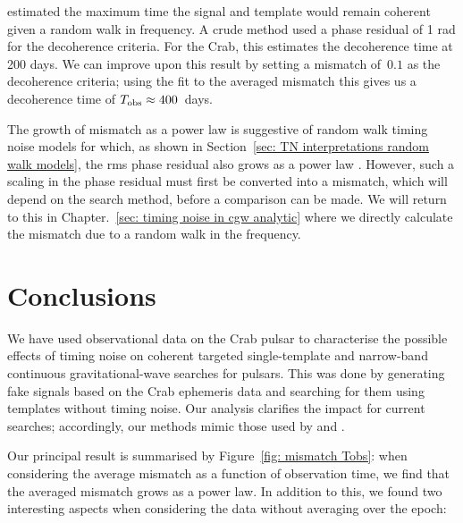 \documentclass[../full_thesis/full_thesis.tex]{subfiles}
\begin{document}
\citet{Jones2004} estimated the maximum time the signal and template would
remain coherent given a random walk in  frequency. A crude method used a
phase residual of 1 rad for the decoherence criteria. For the Crab, this
estimates the decoherence time at 200 days. We can improve upon this result by
setting a mismatch of~$0.1$ as the decoherence criteria; using the fit to the
averaged mismatch this gives us a decoherence time of $T_{\textrm{obs}}\approx 400 $~days.

The growth of mismatch as a power law is suggestive of random walk timing noise
models for which, as shown in Section~\ref{sec: TN interpretations random walk
models}, the rms phase residual also grows as a power law \citep{Boynton1972, Cordes1981}.
However, such a scaling in the phase residual must first be converted into a
mismatch, which will depend on the search method, before a comparison can be
made. We will return to this in Chapter.~\ref{sec: timing noise in cgw
analytic} where we directly calculate the mismatch due to a random walk in
the frequency.


\section{Conclusions}
\label{sec: narrow-band conclusions}
We have used observational data on the Crab pulsar to characterise the possible
effects of timing noise on coherent targeted single-template  and narrow-band
continuous gravitational-wave searches for pulsars.  This was done by generating fake
signals based on the Crab ephemeris data and searching for them using templates
without timing noise. Our analysis clarifies the impact for current searches;
accordingly, our methods mimic those used by \citet{ligo2008} and \citet{ligo2015}.

Our principal result is summarised by Figure~\ref{fig: mismatch Tobs}:
when considering the average mismatch as
a function of observation time,  we find that the averaged
mismatch grows as a power law. In addition to this, we found two interesting
aspects when considering the data without averaging over the epoch:
\end{document}
